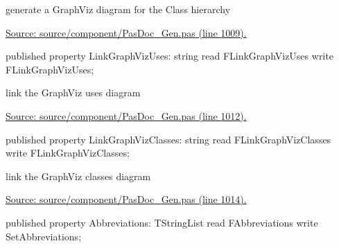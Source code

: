 \documentclass{report}
\newif\ifpdf
\begin{document}
\begin{list}{}
\begin{flushleft}
\ifpdf
\end{flushleft}
\fi


\par generate a GraphViz diagram for the Class hierarchy\par
\href{https://github.com/pasdoc/pasdoc/blob/master/source/component/PasDoc_Gen.pas#L1009}{Source: source/component/PasDoc{\_}Gen.pas (line 1009).}\label{PasDoc_Gen.TDocGenerator-LinkGraphVizUses}
\item[\textbf{LinkGraphVizUses}\hfill]
\ifpdf
\begin{flushleft}
\fi
\begin{ttfamily}
published property LinkGraphVizUses: string read FLinkGraphVizUses write FLinkGraphVizUses;\end{ttfamily}

\ifpdf
\end{flushleft}
\fi


\par link the GraphViz uses diagram\par
\href{https://github.com/pasdoc/pasdoc/blob/master/source/component/PasDoc_Gen.pas#L1012}{Source: source/component/PasDoc{\_}Gen.pas (line 1012).}\label{PasDoc_Gen.TDocGenerator-LinkGraphVizClasses}
\item[\textbf{LinkGraphVizClasses}\hfill]
\ifpdf
\begin{flushleft}
\fi
\begin{ttfamily}
published property LinkGraphVizClasses: string read FLinkGraphVizClasses write FLinkGraphVizClasses;\end{ttfamily}

\ifpdf
\end{flushleft}
\fi


\par link the GraphViz classes diagram\par
\href{https://github.com/pasdoc/pasdoc/blob/master/source/component/PasDoc_Gen.pas#L1014}{Source: source/component/PasDoc{\_}Gen.pas (line 1014).}\label{PasDoc_Gen.TDocGenerator-Abbreviations}
\item[\textbf{Abbreviations}\hfill]
\ifpdf
\begin{flushleft}
\fi
\begin{ttfamily}
published property Abbreviations: TStringList read FAbbreviations write SetAbbreviations;\end{ttfamily}

\ifpdf
\end{flushleft}
\fi



\end{list}
\end{document}
